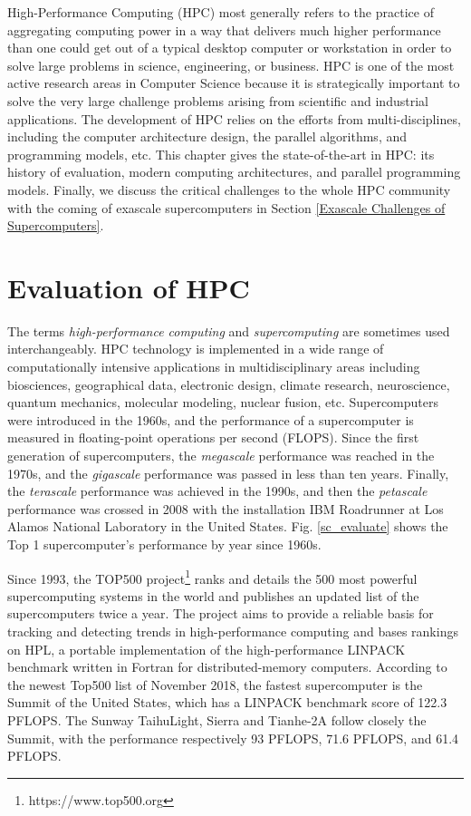 \begin{displayquote}
	\textsf{High-Performance Computing (HPC) most generally refers to the practice of aggregating computing power in a way that delivers much higher performance than one could get out of a typical desktop computer or workstation in order to solve large problems in science, engineering, or business. HPC is one of the most active research areas in Computer Science because it is strategically important to solve the very large challenge problems arising from scientific and industrial applications. The development of HPC relies on the efforts from multi-disciplines, including the computer architecture design, the parallel algorithms, and programming models, etc. This chapter gives the state-of-the-art in HPC: its history of evaluation, modern computing architectures, and parallel programming models. Finally, we discuss the critical challenges to the whole HPC community with the coming of exascale supercomputers in Section \ref{Exascale Challenges of Supercomputers}.}
\end{displayquote}

\vspace{0.6in}

\section{Evaluation of HPC}

The terms \textit{high-performance computing} and \textit{supercomputing} are sometimes used interchangeably. HPC technology is implemented in a wide range of computationally intensive applications in multidisciplinary areas including biosciences, geographical data, electronic design, climate research, neuroscience, quantum mechanics, molecular modeling, nuclear fusion, etc. Supercomputers were introduced in the 1960s, and the performance of a supercomputer is measured in floating-point operations per second (FLOPS). Since the first generation of supercomputers, the \textit{megascale} performance was reached in the 1970s, and the \textit{gigascale} performance was passed in less than ten years. Finally, the \textit{terascale} performance was achieved in the 1990s, and then the \textit{petascale} performance was crossed in 2008 with the installation IBM Roadrunner at Los Alamos National Laboratory in the United States. Fig. \ref{sc_evaluate} shows the Top 1 supercomputer's performance by year since 1960s.

Since 1993, the TOP500 project\footnote{https://www.top500.org} ranks and details the 500 most powerful supercomputing systems in the world and publishes an updated list of the supercomputers twice a year. The project aims to provide a reliable basis for tracking and detecting trends in high-performance computing and bases rankings on HPL, a portable implementation of the high-performance LINPACK benchmark written in Fortran for distributed-memory computers. According to the newest Top500 list of November 2018, the fastest supercomputer is the Summit of the United States, which has a LINPACK benchmark score of 122.3 PFLOPS. The Sunway TaihuLight, Sierra and Tianhe-2A follow closely the Summit, with the performance respectively 93 PFLOPS, 71.6 PFLOPS, and 61.4 PFLOPS. 

